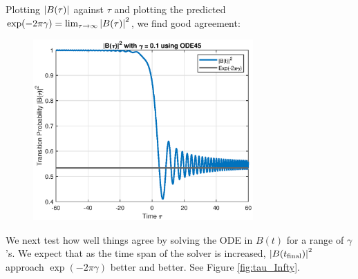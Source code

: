 \documentclass{article}
\theoremstyle{definition}
\begin{document}
Plotting $\abs{B(\tau)}$ against $\tau$ and plotting the predicted $\exp(-2\pi \gamma) = \lim_{\tau\to\infty}\abs{B(\tau)}^2$, we find good agreement:
\begin{figure}[!htb]
	\centering
	\includegraphics[width=0.75\textwidth]{LZ}
\end{figure}


We next test how well things agree by solving the ODE in $B(t)$ for a range of $\gamma$'s. We expect that as the time span of the solver is increased, $\abs{B(t_{\text{final}})}^2$ approach $\exp(-2\pi \gamma)$ better and better. See Figure \ref{fig:tau_Infty}.
\end{document}
